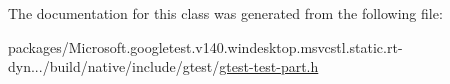 The documentation for this class was generated from the following file\+:\begin{DoxyCompactItemize}
\item 
packages/\+Microsoft.\+googletest.\+v140.\+windesktop.\+msvcstl.\+static.\+rt-\/dyn.../build/native/include/gtest/\mbox{\hyperlink{gtest-test-part_8h}{gtest-\/test-\/part.\+h}}\end{DoxyCompactItemize}
